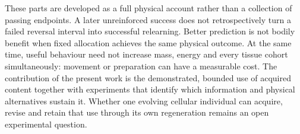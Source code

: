 These parts are developed as a full physical account rather than a collection of passing endpoints. A later unreinforced success does not retrospectively turn a failed reversal interval into successful relearning. Better prediction is not bodily benefit when fixed allocation achieves the same physical outcome. At the same time, useful behaviour need not increase mass, energy and every tissue cohort simultaneously: movement or preparation can have a measurable cost. The contribution of the present work is the demonstrated, bounded use of acquired content together with experiments that identify which information and physical alternatives sustain it. Whether one evolving cellular individual can acquire, revise and retain that use through its own regeneration remains an open experimental question.
